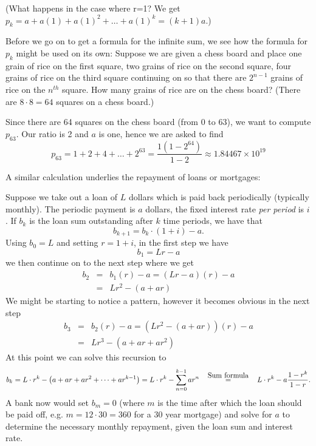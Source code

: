 (What happens in the case where r=1?
We get $p_{k}= a + a(1) + a(1)^{2} + \ldots + a(1)^{k}=(k+1)a$.)
\medskip

Before we go on to get a formula for the infinite sum, we see
how the formula for $p_{k}$ might be used on its own:
Suppose we are given a chess board and place one grain of rice on
the first square, two grains of rice on the second square, four
grains of rice on the third square continuing on so that there are
$2^{n-1}$ grains of rice on the $n^{th}$ square.  How many grains of
rice are on the chess board? (There are $8\cdot 8=64$ squares on a chess
board.) 

Since there are 64 squares on the chess board (from $0$ to $63$), we want to compute
$p_{63}$.  Our ratio is 2 and $a$ is one, hence we are asked to find
\[
p_{63}=1+2+4+ \ldots +2^{63} =
\frac{1(1-2^{64})}{1-2} \approx 1.84467 \times 10^{19}
\]

A similar calculation underlies the repayment of loans or mortgages:

Suppose we take out a loan of $L$ dollars which is paid back
periodically (typically monthly). The periodic payment is $a$
dollars, the fixed interest rate \textit{per period} is $i$. If
$b_k$ is the loan sum outstanding after $k$ time periods, we have
that
\[
b_{k+1}=b_k\cdot (1+i)-a.
\]
Using $b_0=L$ and setting $r=1+i$, in the first step we have
\[b_{1}=Lr-a\] we then continue on to the next step where we
get
\begin{eqnarray*}
b_{2}&=&b_{1}(r)-a 
=(Lr-a)(r)-a \\
&=&Lr^{2}-(a+ar)
\end{eqnarray*}
We might be starting to notice a pattern, however it becomes obvious
in the next step
\begin{eqnarray*}
b_{3}&=&b_{2}(r)-a 
=(Lr^{2}-(a+ar))(r)-a \\
&=&Lr^{3}-(a+ar+ar^{2})
\end{eqnarray*}
At this point we can solve this recursion to
\[
b_k=L\cdot r^k-\left(a+ar+ar^2+\cdots+ar^{k-1}\right)
=L\cdot r^k-\sum_{n=0}^{k-1}ar^n
\mathop{=}\limits^{\mbox{\quad Sum formula\quad}}L\cdot r^k-a\frac{1-r^k}{1-r}.
\]
A bank now would set $b_m=0$ (where $m$ is the time after which the loan
should be paid off, e.g. $m=12\cdot 30=360$ for a 30 year mortgage)
and solve for $a$ to determine the
necessary monthly repayment, given the loan sum and interest rate.

